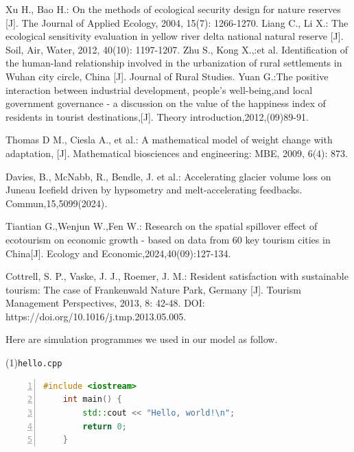 \documentclass[UTF8]{mcmthesis}
\begin{document}
    \begin{thebibliography}{99}

        Xu H., Bao H.: On the methods of ecological security design for nature reserves [J]. The Journal of Applied Ecology, 2004, 15(7): 1266-1270.
         Liang C., Li X.: The ecological sensitivity evaluation in yellow river delta national natural reserve [J]. Soil, Air, Water, 2012, 40(10): 1197-1207.
        Zhu S., Kong X.,:et al. Identification of the human-land relationship involved in the urbanization of rural settlements in Wuhan city circle, China [J]. Journal of Rural Studies.
        Yuan G.:The positive interaction between industrial development, people's well-being,and local government governance - a discussion on the value of the happiness index of residents in tourist destinations,[J]. Theory introduction,2012,(09)89-91.
        
        Thomas D M., Ciesla A., et al.: A mathematical model of weight change with adaptation, [J]. Mathematical biosciences and engineering: MBE, 2009, 6(4): 873.
        
        Davies, B., McNabb, R., Bendle, J. et al.: Accelerating glacier volume loss on Juneau Icefield driven by hypsometry and melt-accelerating feedbacks. Commun,15,5099(2024). 
        
        Tiantian G.,Wenjun W.,Fen W.:
        Research on the spatial spillover effect of ecotourism on economic growth - based on data from 60 key tourism cities in China[J]. Ecology and Economic,2024,40(09):127-134.
        
        Cottrell, S. P., Vaske, J. J., Roemer, J. M.:
        Resident satisfaction with sustainable tourism: The case of Frankenwald Nature Park, Germany [J].
        Tourism Management Perspectives, 2013, 8: 42-48. 
        DOI: https://doi.org/10.1016/j.tmp.2013.05.005.
        
    
    \end{thebibliography}


    \begin{appendices}
        Here are simulation programmes we used in our model as follow.
        
        \vspace{.5em}
        \noindent(1)\quad \verb|hello.cpp|
        \vspace{.5em}
        \begin{lstlisting}[language = c++, numbers = left]
    #include <iostream>
    int main() {
        std::cout << "Hello, world!\n";
        return 0;
    }
        \end{lstlisting}

    \end{appendices}
\end{document}
